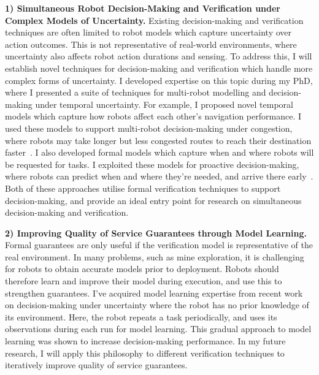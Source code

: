 \documentclass[12pt]{article}
\begin{document}
\vspace*{1ex}\noindent\textbf{1) Simultaneous Robot Decision-Making and Verification under Complex Models of Uncertainty.} 
%
Existing decision-making and verification techniques are often limited to robot models which capture uncertainty over action outcomes.
%
This is not representative of real-world environments, where uncertainty also affects robot action durations and sensing.
%
To address this, I will establish novel techniques for decision-making and verification which handle more complex forms of uncertainty.
%
I developed expertise on this topic during my PhD, where I presented a suite of techniques for multi-robot modelling and decision-making under temporal uncertainty.
%
For example, I proposed novel temporal models which capture how robots affect each other's navigation performance.
%
I used these models to support multi-robot decision-making under congestion, where robots may take longer but less congested routes to reach their destination faster~\cite{street2020multi,street2021congestion}.
%
I also developed formal models which capture when and where robots will be requested for tasks.
%
I exploited these models for proactive decision-making, where robots can predict when and where they're needed, and arrive there early~\cite{street2024right}.
%
Both of these approaches utilise formal verification techniques to support decision-making, and provide an ideal entry point for research on simultaneous decision-making and verification.

\vspace*{1ex}\noindent\textbf{2) Improving Quality of Service Guarantees through Model Learning.}
%
Formal guarantees are only useful if the verification model is representative of the real environment.
%
In many problems, such as mine exploration, it is challenging for robots to obtain accurate models prior to deployment.
%
Robots should therefore learn and improve their model during execution, and use this to strengthen guarantees.
%
I've acquired model learning expertise from recent work on decision-making under uncertainty where the robot has no prior knowledge of its environment.
%
Here, the robot repeats a task periodically, and uses its observations during each run for model learning.
%
This gradual approach to model learning was shown to increase decision-making performance.
%
In my future research, I will apply this philosophy to different verification techniques to iteratively improve quality of service guarantees.
\end{document}
